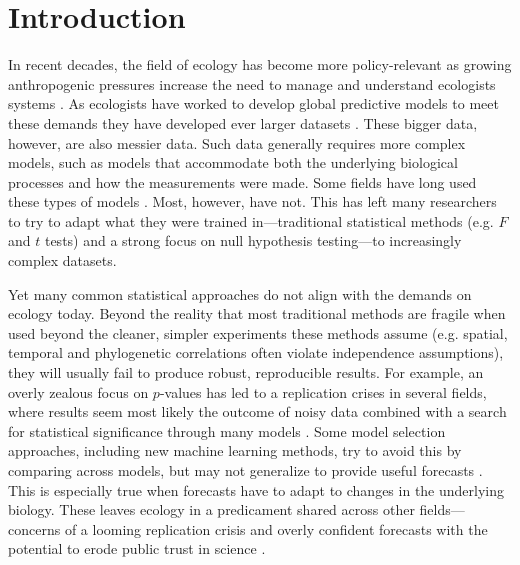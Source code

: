 \documentclass[11pt]{article}
\begin{document}
\section*{Introduction}
In recent decades, the field of ecology has become more policy-relevant as growing anthropogenic pressures increase the need to manage and understand ecologists systems  \citep{hak2016sustainable,lindenmayer2010science}. As ecologists have worked to develop global predictive models to meet these demands they have developed ever larger datasets \citep{Hampton2013}. These bigger data, however, are also messier data. Such data generally requires more complex models, such as models that accommodate both the underlying biological processes and how the measurements were made. Some fields have long used these types of models \citep[generally in fields focused on inferring population sizes for management,][]{muthuku2008,zheng2007,trijoulet2018,strinella2020potential}. Most, however, have not. This has left many researchers to try to adapt what they were trained in---traditional statistical methods (e.g. $F$ and $t$ tests) and a strong focus on null hypothesis testing---to increasingly complex datasets. 

Yet many common statistical approaches do not align with the demands on ecology today. Beyond the reality that most traditional methods are fragile when used beyond the cleaner, simpler experiments these methods assume (e.g. spatial, temporal and phylogenetic correlations often violate independence assumptions), they will usually fail to produce robust, reproducible results. For example, an overly zealous focus on $p$-values has led to a replication crises in several fields, where results seem most likely the outcome of noisy data combined with a search for statistical significance through many models \citep[effectively a garden of forking paths,][]{halsey2015,loken2017}. Some model selection approaches, including new machine learning methods, try to avoid this by comparing across models, but may not generalize to provide useful forecasts \citep{boettiger2022forecast}. This is especially true when forecasts have to adapt to changes in the underlying biology. These leaves ecology in a predicament shared across other fields---concerns of a looming replication crisis \citep{filazzola2021replication,fraser2020role} and overly confident forecasts with the potential to erode public trust in science \citep{leroux2019prevalence,boettiger2022forecast}. 
\end{document}
